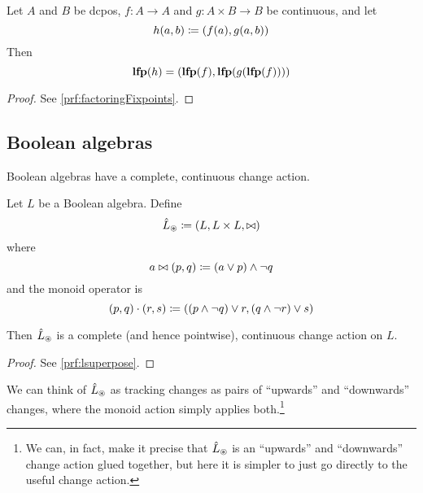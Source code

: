 \begin{prop}[name=Factoring of fixpoints, restate=factoringFixpoints]
  \label{prop:factoringFixpoints}
  Let $A$ and $B$ be dcpos, $f : A \rightarrow A$ and $g: A \times B \rightarrow B$ be continuous, and let
  \begin{displaymath}
    h(a, b) \coloneqq (f(a), g(a, b))
  \end{displaymath}
  Then
  \begin{displaymath}
    \mathbf{lfp}(h) = (\mathbf{lfp}(f), \mathbf{lfp}(g(\mathbf{lfp}(f))))
  \end{displaymath}
\end{prop}
\ifproofs
\begin{proof}
  See \cref{prf:factoringFixpoints}.
\end{proof}
\fi

\subsection{Boolean algebras}
\label{sec:booleanAlgebras}

Boolean algebras have a complete, continuous change action.

\begin{prop}[name=Boolean algebra change actions, restate=lsuperpose]
  Let $L$ be a Boolean algebra. Define
  \begin{displaymath}
    \hat{L}_\circledast \coloneqq (L,L \times L,\bowtie)
  \end{displaymath}
  where
  \begin{displaymath}
    a \bowtie (p, q) \coloneqq (a \vee p) \wedge \neg q
  \end{displaymath}
  and the monoid operator is
  \begin{displaymath}
    (p, q) \cdot (r, s) \coloneqq ((p \wedge \neg q) \vee r, (q \wedge \neg r) \vee s)
  \end{displaymath}

  Then $\hat{L}_\circledast$ is a complete (and hence pointwise), continuous change action on $L$.
\end{prop}
\ifproofs
\begin{proof}
  See \cref{prf:lsuperpose}.
\end{proof}
\fi

We can think of $\hat{L}_\circledast$ as tracking changes as pairs of ``upwards'' and
``downwards'' changes, where the monoid action simply applies both.\footnote{We
  can, in fact, make it precise that $\hat{L}_\circledast$ is an ``upwards''
  and ``downwards'' change action glued together, but here it is simpler to
  just go directly to the useful change action.}  

